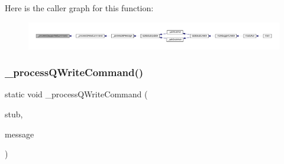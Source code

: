 Here is the caller graph for this function\+:
\nopagebreak
\begin{figure}[H]
\begin{center}
\leavevmode
\includegraphics[width=350pt]{gdb-stub_8c_aa885c9605db7de6ec89abaf7c094c61f_icgraph}
\end{center}
\end{figure}
\mbox{\label{gdb-stub_8c_a34a7a41e3881752f1882a6edccd6edce}} 
\subsubsection{\texorpdfstring{\+\_\+process\+Q\+Write\+Command()}{\_processQWriteCommand()}}
{\footnotesize\ttfamily static void \+\_\+process\+Q\+Write\+Command (\begin{DoxyParamCaption}\item[{struct G\+D\+B\+Stub $\ast$}]{stub,  }\item[{const char $\ast$}]{message }\end{DoxyParamCaption})\hspace{0.3cm}{\ttfamily [static]}}

